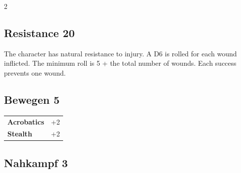 \begin{multicols}{2}
\begin{tcolorbox}

\end{tcolorbox}

\begin{tcolorbox}
    \subsection*{Resistance \hfill \small{20 }}
    \tcblower
The character has natural resistance to injury. A D6 is rolled for each wound inflicted. The minimum roll is 5 + the total number of wounds. Each success prevents one wound.


\vspace{3mm}



\end{tcolorbox}

\begin{tcolorbox}
    \subsection*{Bewegen \hfill \small{5 }}
    \tcblower




\begin{tabular}{@{}ll@{}}
    \textbf{Acrobatics} & +2\\
    \textbf{Stealth} & +2\\
\end{tabular}


\end{tcolorbox}

\begin{tcolorbox}
    \subsection*{Nahkampf \hfill \small{3 }}
    \tcblower





\end{tcolorbox}
\end{multicols}
